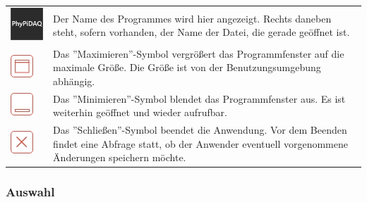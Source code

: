 \documentclass[parskip=full]{scrartcl}
\begin{document}
\begin{tabular}[t]{p{1cm} p{10cm}}
	\vspace{0cm}\includegraphics[width = 1 cm]{Grafik/PhyPiDAQ.jpg} & Der Name des Programmes wird hier angezeigt. Rechts daneben steht, sofern vorhanden, der Name der Datei, die gerade geöffnet ist.\newline\\
	\vspace{0cm}\includegraphics[width = 1 cm]{Grafik/Maximieren.jpg} & Das ''Maximieren''-Symbol vergrößert das Programmfenster auf die maximale Größe. Die Größe ist von der Benutzungsumgebung abhängig.\newline\\
	\vspace{0cm}\includegraphics[width = 1 cm]{Grafik/Minimieren.jpg} & Das ''Minimieren''-Symbol blendet das Programmfenster aus. Es ist weiterhin geöffnet und wieder aufrufbar. \\
	\vspace{0cm}\includegraphics[width = 1 cm]{Grafik/Schliessen.jpg} & Das ''Schließen''-Symbol beendet die Anwendung. Vor dem Beenden findet eine Abfrage statt, ob der Anwender eventuell vorgenommene Änderungen speichern möchte.\newline\\
\end{tabular}

\subsubsection{Auswahl}
\end{document}
